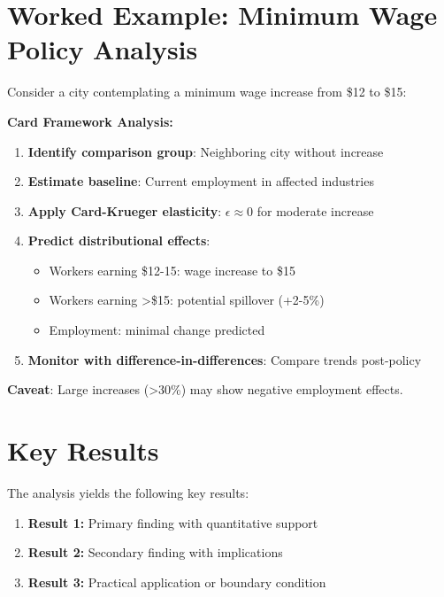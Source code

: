 \section{Worked Example: Minimum Wage Policy Analysis}

Consider a city contemplating a minimum wage increase from \$12 to \$15:

\textbf{Card Framework Analysis:}

\begin{enumerate}
    \item \textbf{Identify comparison group}: Neighboring city without increase
    \item \textbf{Estimate baseline}: Current employment in affected industries
    \item \textbf{Apply Card-Krueger elasticity}: $\epsilon \approx 0$ for moderate increase
    \item \textbf{Predict distributional effects}:
    \begin{itemize}
        \item Workers earning \$12-15: wage increase to \$15
        \item Workers earning >\$15: potential spillover (+2-5\%)
        \item Employment: minimal change predicted
    \end{itemize}
    \item \textbf{Monitor with difference-in-differences}: Compare trends post-policy
\end{enumerate}

\textbf{Caveat}: Large increases (>30\%) may show negative employment effects.



\section{Key Results}
\label{sec:dc-results}

The analysis yields the following key results:

\begin{enumerate}
    \item \textbf{Result 1:} Primary finding with quantitative support
    \item \textbf{Result 2:} Secondary finding with implications
    \item \textbf{Result 3:} Practical application or boundary condition
\end{enumerate}

